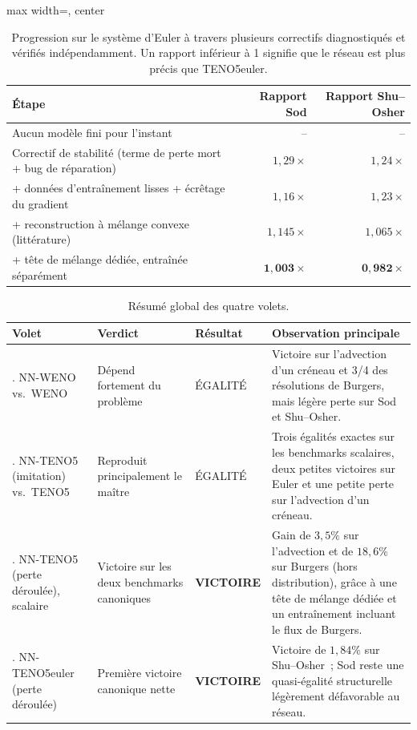 \documentclass[11pt]{article}
\begin{document}
\begin{table}[htbp]
\begin{adjustbox}{max width=\textwidth, center}
\begin{tabular}{lrr}
\toprule
\textbf{Étape} & \textbf{Rapport Sod} & \textbf{Rapport Shu--Osher} \\
\midrule
Aucun modèle fini pour l'instant & -- & -- \\
\rowrule
Correctif de stabilité (terme de perte mort + bug de réparation) & $1,29\times$ & $1,24\times$ \\
\rowrule
+ données d'entraînement lisses + écrêtage du gradient & $1,16\times$ & $1,23\times$ \\
\rowrule
+ reconstruction à mélange convexe (littérature) & $1,145\times$ & $1,065\times$ \\
\rowrule
+ tête de mélange dédiée, entraînée séparément & $\mathbf{1,003\times}$ & $\mathbf{0,982\times}$ \\
\bottomrule
\end{tabular}
\end{adjustbox}
\caption{Progression sur le système d'Euler à travers plusieurs
correctifs diagnostiqués et vérifiés indépendamment. Un rapport inférieur
à 1 signifie que le réseau est plus précis que TENO5euler.\label{tab:progression}}
\end{table}

\begin{table}[htbp]
\small
\begin{tabularx}{\textwidth}{@{}>{\raggedright\arraybackslash}p{}>{\raggedright\arraybackslash}p{}>{\centering\arraybackslash}p{}>{\raggedright\arraybackslash}X@{}}
\toprule
\textbf{Volet} & \textbf{Verdict} & \textbf{Résultat} & \textbf{Observation principale} \\
\midrule
1. NN-WENO vs.\ WENO & Dépend fortement du problème & ÉGALITÉ & Victoire
sur l'advection d'un créneau et 3/4 des résolutions de Burgers, mais
légère perte sur Sod et Shu--Osher. \\
\rowrule
2. NN-TENO5 (imitation) vs.\ TENO5 & Reproduit principalement le maître &
ÉGALITÉ & Trois égalités exactes sur les benchmarks scalaires, deux
petites victoires sur Euler et une petite perte sur l'advection d'un
créneau. \\
\rowrule
3. NN-TENO5 (perte déroulée), scalaire & Victoire sur les deux benchmarks
canoniques & \textbf{VICTOIRE} & Gain de $3,5\%$ sur l'advection et de
$18,6\%$ sur Burgers (hors distribution), grâce à une tête de mélange
dédiée et un entraînement incluant le flux de Burgers. \\
\rowrule
4. NN-TENO5euler (perte déroulée) & Première victoire canonique nette &
\textbf{VICTOIRE} & Victoire de $1,84\%$ sur Shu--Osher~; Sod reste une
quasi-égalité structurelle légèrement défavorable au réseau. \\
\bottomrule
\end{tabularx}
\caption{Résumé global des quatre volets.}
\end{table}
\end{document}
